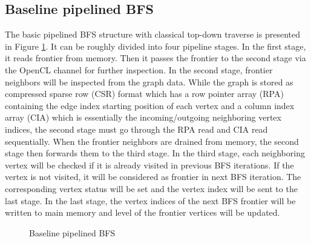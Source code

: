 \subsection{Baseline pipelined BFS}
The basic pipelined BFS structure with classical top-down traverse 
is presented in Figure \ref{fig:base-bfs}. It can be roughly 
divided into four pipeline stages. In the first stage, it reads 
frontier from memory. Then it passes the frontier to the second stage
via the OpenCL channel for further inspection. In the second stage, 
frontier neighbors will be inspected from the graph data. While the 
graph is stored as compressed sparse row (CSR) format which has a row 
pointer array (RPA) containing the edge index starting position of each 
vertex and a column index array (CIA) which is essentially the incoming/outgoing 
neighboring vertex indices, the second stage must go through the RPA read and 
CIA read sequentially. When the frontier neighbors are 
drained from memory, the second stage then forwards them to the third stage.
In the third stage, each neighboring vertex will be checked if it is 
already visited in previous BFS iterations. If the vertex is not visited, 
it will be considered as frontier in next BFS iteration. The corresponding 
vertex status will be set and the vertex index will be sent to the last stage.
In the last stage, the vertex indices of the next BFS frontier will be 
written to main memory and level of the frontier vertices will be updated.

\begin{figure}
    \caption{Baseline pipelined BFS}
\label{fig:base-bfs}
\vspace{-1em}
\end{figure}


